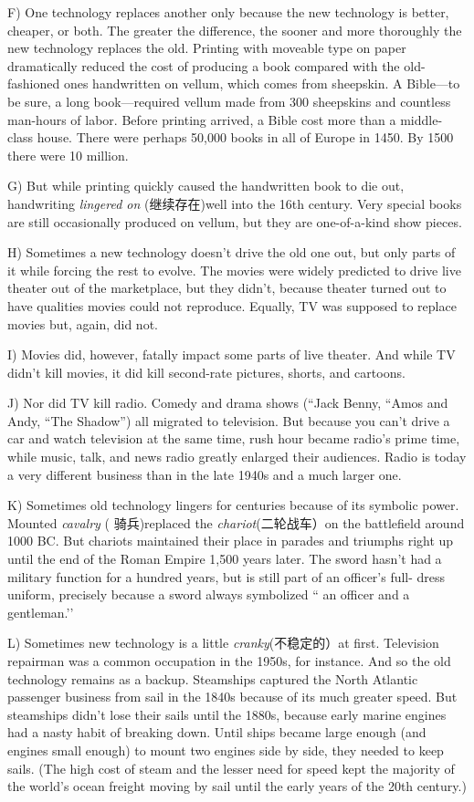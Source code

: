 \documentclass[UTF8,11pt]{ctexart}
\begin{document}
F) One technology replaces another only because the new technology is better, cheaper, or both. The greater the difference, the sooner and more thoroughly the new technology replaces the old. Printing with moveable type on paper dramatically reduced the cost of producing a book compared with the old-fashioned ones handwritten on vellum, which comes from sheepskin. A Bible—to be sure, a long book—required vellum made from 300 sheepskins and countless man-hours of labor. Before printing arrived, a Bible cost more than a middle-class house. There were perhaps 50,000 books in all of Europe in 1450. By 1500 there were 10 million.


G) But while printing quickly caused the handwritten book to die out, handwriting\textit{ lingered on} (继续存在)well into the 16th century. Very special books are still occasionally produced on vellum, but they are one-of-a-kind show pieces.


H) Sometimes a new technology doesn’t drive the old one out, but only parts of it while forcing the rest to evolve. The movies were widely predicted to drive live theater out of the marketplace, but they didn’t, because theater turned out to have qualities movies could not reproduce. Equally, TV was supposed to replace movies but, again, did not.


I) Movies did, however, fatally impact some parts of live theater. And while TV didn’t kill movies, it did kill second-rate pictures, shorts, and cartoons.


J) Nor did TV kill radio. Comedy and drama shows (“Jack Benny, “Amos and Andy, “The Shadow”) all migrated to television. But because you can’t drive a car and watch television at the same time, rush hour became radio’s prime time, while music, talk, and news radio greatly enlarged their audiences. Radio is today a very different business than in the late 1940s and a much larger one.


K) Sometimes old technology lingers for centuries because of its symbolic power. Mounted\textit{ cavalry} ( 骑兵)replaced the \textit{chariot}(二轮战车）on the battlefield around 1000 BC. But chariots maintained their place in parades and triumphs right up until the end of the Roman Empire 1,500 years later. The sword hasn’t had a military function for a hundred years, but is still part of an officer’s full- dress uniform, precisely because a sword always symbolized “ an officer and a gentleman.’’


L) Sometimes new technology is a little\textit{ cranky}(不稳定的）at first. Television repairman was a common occupation in the 1950s, for instance. And so the old technology remains as a backup. Steamships captured the North Atlantic passenger business from sail in the 1840s because of its much greater speed. But steamships didn’t lose their sails until the 1880s, because early marine engines had a nasty habit of breaking down. Until ships became large enough (and engines small enough) to mount two engines side by side, they needed to keep sails. (The high cost of steam and the lesser need for speed kept the majority of the world’s ocean freight moving by sail until the early years of the 20th century.)
\end{document}
